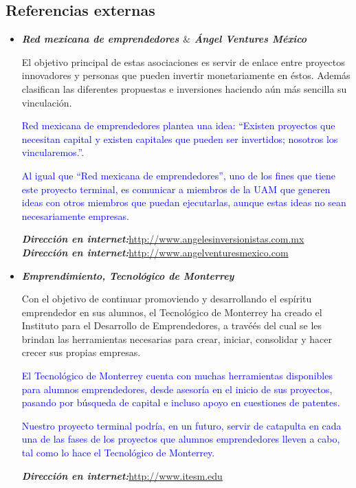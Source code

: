 \documentclass[11pt,letterpaper,titlepage]{article}
\begin{document}
\subsection{Referencias externas}
\begin{itemize}
\item \textit{\textbf{Red mexicana de emprendedores $\&$  \'Angel Ventures M\'exico}}

El objetivo principal de estas asociaciones es servir de enlace entre proyectos innovadores y personas que pueden invertir monetariamente en \'estos. Adem\'as clasifican las diferentes propuestas e inversiones haciendo a\'un m\'as sencilla su vinculaci\'on.

\textcolor{blue}{Red mexicana de emprendedores plantea una idea: ``Existen proyectos que necesitan capital y existen capitales que pueden ser invertidos; nosotros los vincularemos.''. }


\textcolor{blue}{Al igual que ``Red mexicana de emprendedores'', uno de los fines que tiene este proyecto terminal, es comunicar a miembros de la UAM que generen ideas con otros miembros que puedan ejecutarlas, aunque estas ideas no sean necesariamente empresas.}

\textit{\textbf{Direcci\'on en internet:}}\href{http://www.angelesinversionistas.com.mx}{http://www.angelesinversionistas.com.mx}\\
\textit{\textbf{Direcci\'on en internet:}}\href{http://www.angelventuresmexico.com}{http://www.angelventuresmexico.com}


\item \textit{\textbf{Emprendimiento, Tecnol\'ogico de Monterrey}}

Con el objetivo de continuar promoviendo y desarrollando el esp\'iritu emprendedor en sus alumnos, el Tecnol\'ogico de Monterrey ha creado el Instituto para el Desarrollo de Emprendedores, a travé\'es del cual se les brindan las herramientas necesarias para crear, iniciar, consolidar y hacer crecer sus propias empresas. 

\textcolor{blue}{El Tecnol\'ogico de Monterrey cuenta con muchas herramientas disponibles para alumnos emprendedores, desde asesor\'ia en el inicio de sus proyectos, pasando por b\'usqueda de capital e incluso apoyo en cuestiones de patentes.}

\textcolor{blue}{Nuestro proyecto terminal podr\'ia, en un futuro, servir de catapulta en cada una de las fases de los proyectos que alumnos emprendedores lleven a cabo, tal como lo hace el Tecnol\'ogico de Monterrey.}

\textit{\textbf{Direcci\'on en internet:}}\href{http://www.itesm.edu/wps/wcm/connect/ITESM/Tecnologico+de+Monterrey/Emprendimiento/#2}{http://www.itesm.edu}



\end{itemize}
\end{document}
